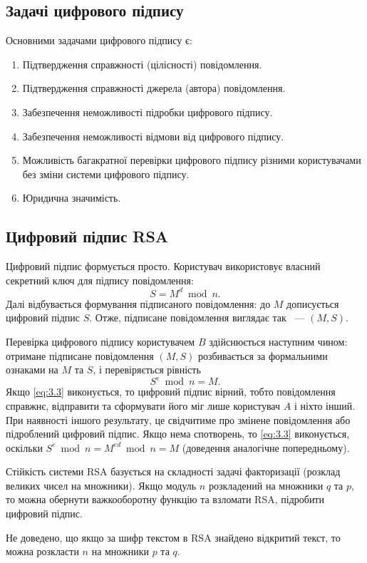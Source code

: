 \subsection{Задачі цифрового підпису}

Основними задачами цифрового підпису є:

\begin{enumerate}
\item Підтвердження справжності (цілісності) повідомлення.
\item Підтвердження справжності джерела (автора) повідомлення.
\item Забезпечення неможливості підробки цифрового підпису.
\item Забезпечення неможливості відмови від цифрового підпису.
\item Можливість багакратної перевірки цифрового підпису різними користувачами без зміни системи цифрового підпису. 
\item Юридична значимість.
\end{enumerate}

\subsection{Цифровий підпис RSA}
Цифровий підпис формується просто. Користувач використовує власний секретний ключ для підпису повідомлення:
\begin{equation}
S = M ^d \bmod n.
\end{equation}
Далі відбувається формування підписаного повідомлення: до $M$ дописується цифровий підпис $S$. Отже, підписане повідомлення виглядає так ~--- $(M, S)$.

Перевірка цифрового підпису користувачем $B$ здійснюється наступним чином: отримане підписане повідомлення $(M, S)$ розбивається за формальними ознаками на $M$ та $S$, і перевіряється рівність 
\begin{equation} \label{eq:3.3} 
S ^ e \bmod n = M.
\end{equation}
Якщо \eqref{eq:3.3} виконується, то цифровий підпис вірний, тобто повідомлення справжнє, відправити та сформувати його міг лише користувач $A$ і ніхто інший. При наявності іншого результату, це свідчитиме про змінене повідомлення або підроблений цифровий підпис.
Якщо нема спотворень, то \eqref{eq:3.3} виконується, оскільки $S ^ e \bmod n = M ^ {ed} \bmod n = M$ (доведення аналогічне попередньому).

Стійкість системи RSA базується на складності задачі факторизації (розклад великих чисел на множники). Якщо модуль $n$ розкладений на множники $q$ та $p$, то можна обернути важкооборотну функцію та взломати RSA, підробити цифровий підпис.

Не доведено, що якщо за шифр текстом в RSA знайдено відкритий текст, то можна розкласти $n$ на множники $p$ та $q$.
